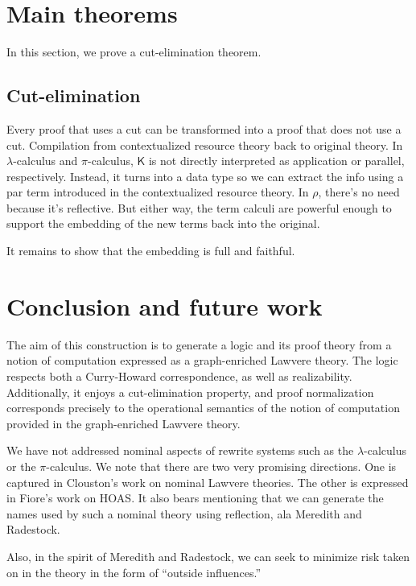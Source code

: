 \documentclass{llncs}
\renewcommand{\:}{\colon}
\newcommand{\pic}{$\pi$-calculus}
\begin{document}

\section{Main theorems}
In this section, we prove a cut-elimination theorem.
\subsection{Cut-elimination}
Every proof that uses a cut can be transformed into a proof that does
not use a cut.  Compilation from contextualized resource theory back
to original theory. In $\lambda$-calculus and {\pic}, $\mathsf{K}$ is
not directly interpreted as application or parallel,
respectively. Instead, it turns into a data type so we can extract the
info using a par term introduced in the contextualized resource
theory.  In $\rho$, there's no need because it's reflective.  But either
way, the term calculi are powerful enough to support the embedding of
the new terms back into the original.

It remains to show that the embedding is full and faithful.  

\section{Conclusion and future work}

The aim of this construction is to generate a logic and its proof
theory from a notion of computation expressed as a graph-enriched
Lawvere theory. The logic respects both a Curry-Howard correspondence,
as well as realizability. Additionally, it enjoys a cut-elimination
property, and proof normalization corresponds precisely to the
operational semantics of the notion of computation provided in the
graph-enriched Lawvere theory.

We have not addressed nominal aspects of rewrite systems such as the
$\lambda$-calculus or the {\pic}. We note that there are two very
promising directions. One is captured in Clouston’s work on nominal
Lawvere theories. The other is expressed in Fiore’s work on HOAS. It
also bears mentioning that we can generate the names used by such a
nominal theory using reflection, ala Meredith and Radestock.

Also, in the spirit of Meredith and Radestock, we can seek to minimize
risk taken on in the theory in the form of “outside influences.”




\end{document}
